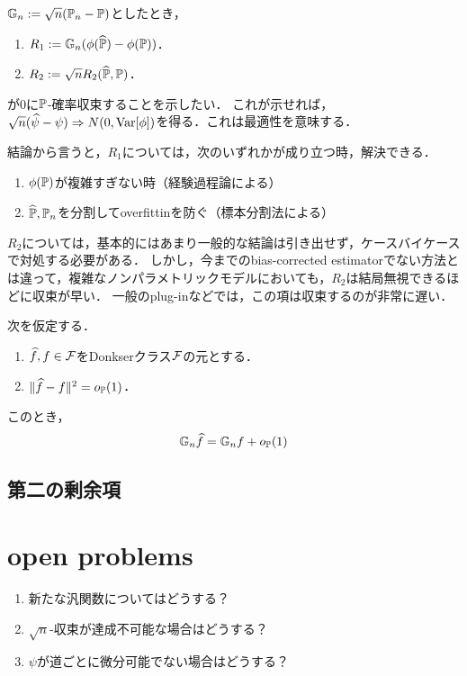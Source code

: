 \documentclass[uplatex,dvipdfmx]{jsreport}
\begin{document}
\begin{problem}
    $\mathbb{G}_n:=\sqrt{n}(\mathbb{P}_n-\mathbb{P})$としたとき，
    \begin{enumerate}
        \item $R_1:=\mathbb{G}_n(\phi(\widehat{\mathbb{P}})-\phi(\mathbb{P}))$．
        \item $R_2:=\sqrt{n}R_2(\widehat{\mathbb{P}},\mathbb{P})$．
    \end{enumerate}
    が$0$に$\mathbb{P}$-確率収束することを示したい．
    これが示せれば，$\sqrt{n}(\widehat{\psi}-\psi)\Rightarrow N(0,\mathrm{Var}[\phi])$を得る．これは最適性を意味する．
\end{problem}
\begin{discussion}
    結論から言うと，$R_1$については，次のいずれかが成り立つ時，解決できる．
    \begin{enumerate}
        \item $\phi(\mathbb{P})$が複雑すぎない時（経験過程論による）
        \item $\widehat{\mathbb{P}},\mathbb{P}_n$を分割してoverfittinを防ぐ（標本分割法による）
    \end{enumerate}
    $R_2$については，基本的にはあまり一般的な結論は引き出せず，ケースバイケースで対処する必要がある．
    しかし，今までのbias-corrected estimatorでない方法とは違って，複雑なノンパラメトリックモデルにおいても，$R_2$は結局無視できるほどに収束が早い．
    一般のplug-inなどでは，この項は収束するのが非常に遅い．
\end{discussion}

\begin{lemma}
    次を仮定する．
    \begin{enumerate}[({A}1)]
        \item $\widehat{f},f\in\mathcal{F}$をDonkserクラス$\mathcal{F}$の元とする．
        \item $\|\widehat{f}-f\|^2=o_{\mathbb{P}}(1)$．
    \end{enumerate}
    このとき，
    \[\mathbb{G}_n\widehat{f}=\mathbb{G}_nf+o_{\mathbb{P}}(1)\]
\end{lemma}

\subsection{第二の剰余項}

\section{open problems}

\begin{enumerate}
    \item 新たな汎関数についてはどうする？
    \item $\sqrt{n}$-収束が達成不可能な場合はどうする？
    \item $\psi$が道ごとに微分可能でない場合はどうする？
\end{enumerate}
\end{document}
